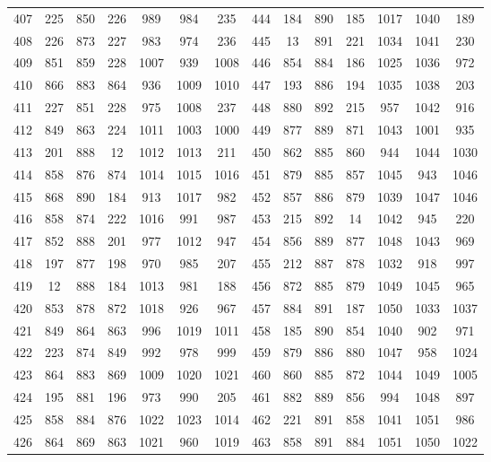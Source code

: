 \begin{apendicesenv}
\begin{table}[H]
\begin{tabular}{@{}ccccccc@{\hspace{1.0cm}}ccccccc@{}}
		407 &  225 &  850 &  226 &  989 &  984 &  235 & 444 &  184 &  890 &  185 & 1017 & 1040 &  189 \\
		408 &  226 &  873 &  227 &  983 &  974 &  236 & 445 &   13 &  891 &  221 & 1034 & 1041 &  230 \\
		409 &  851 &  859 &  228 & 1007 &  939 & 1008 & 446 &  854 &  884 &  186 & 1025 & 1036 &  972 \\
		410 &  866 &  883 &  864 &  936 & 1009 & 1010 & 447 &  193 &  886 &  194 & 1035 & 1038 &  203 \\
		411 &  227 &  851 &  228 &  975 & 1008 &  237 & 448 &  880 &  892 &  215 &  957 & 1042 &  916 \\
		412 &  849 &  863 &  224 & 1011 & 1003 & 1000 & 449 &  877 &  889 &  871 & 1043 & 1001 &  935 \\
		413 &  201 &  888 &   12 & 1012 & 1013 &  211 & 450 &  862 &  885 &  860 &  944 & 1044 & 1030 \\
		414 &  858 &  876 &  874 & 1014 & 1015 & 1016 & 451 &  879 &  885 &  857 & 1045 &  943 & 1046 \\
		415 &  868 &  890 &  184 &  913 & 1017 &  982 & 452 &  857 &  886 &  879 & 1039 & 1047 & 1046 \\
		416 &  858 &  874 &  222 & 1016 &  991 &  987 & 453 &  215 &  892 &   14 & 1042 &  945 &  220 \\
		417 &  852 &  888 &  201 &  977 & 1012 &  947 & 454 &  856 &  889 &  877 & 1048 & 1043 &  969 \\
		418 &  197 &  877 &  198 &  970 &  985 &  207 & 455 &  212 &  887 &  878 & 1032 &  918 &  997 \\
		419 &   12 &  888 &  184 & 1013 &  981 &  188 & 456 &  872 &  885 &  879 & 1049 & 1045 &  965 \\
		420 &  853 &  878 &  872 & 1018 &  926 &  967 & 457 &  884 &  891 &  187 & 1050 & 1033 & 1037 \\
		421 &  849 &  864 &  863 &  996 & 1019 & 1011 & 458 &  185 &  890 &  854 & 1040 &  902 &  971 \\
		422 &  223 &  874 &  849 &  992 &  978 &  999 & 459 &  879 &  886 &  880 & 1047 &  958 & 1024 \\
		423 &  864 &  883 &  869 & 1009 & 1020 & 1021 & 460 &  860 &  885 &  872 & 1044 & 1049 & 1005 \\
		424 &  195 &  881 &  196 &  973 &  990 &  205 & 461 &  882 &  889 &  856 &  994 & 1048 &  897 \\
		425 &  858 &  884 &  876 & 1022 & 1023 & 1014 & 462 &  221 &  891 &  858 & 1041 & 1051 &  986 \\
		426 &  864 &  869 &  863 & 1021 &  960 & 1019 & 463 &  858 &  891 &  884 & 1051 & 1050 & 1022 \\
		\bottomrule
	\end{tabular}
\end{table}


\end{apendicesenv}
